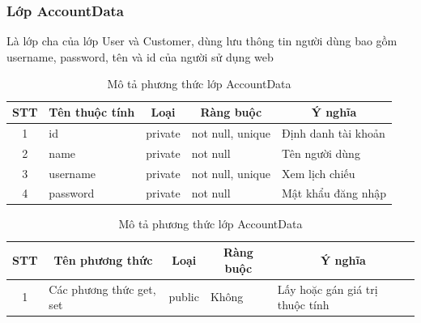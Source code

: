 \documentclass[a4paper, 12pt]{article}
\begin{document}
\subsubsection{Lớp AccountData}
Là lớp cha của lớp User và Customer, dùng lưu thông tin người dùng bao gồm username, password, tên và id của người sử dụng web
\begin{table}[h]
	\begin{center}
		\begin{tabular}{|c|l|c|l|l|}
			\hline
			STT & \multicolumn{1}{c|}{Tên thuộc tính} & Loại                         & \multicolumn{1}{c|}{Ràng buộc} & \multicolumn{1}{c|}{Ý nghĩa} \\ \hline
			1   & id                                  & \multicolumn{1}{l|}{private} & not null, unique               & Định danh tài khoản          \\ \hline
			2   & name                                & private                      & not null                       & Tên người dùng               \\ \hline
			3   & username                            & private                      & not null, unique               & Xem lịch chiếu               \\ \hline
			4   & password                            & private                      & not null                       & Mật khẩu đăng nhập           \\ \hline
			\end{tabular}
		\caption{Mô tả phương thức lớp AccountData}
	\end{center}
\end{table}

\begin{table}[H]
	\begin{center}
		\begin{tabular}{|c|l|c|l|l|}
			\hline
			STT & \multicolumn{1}{c|}{Tên phương thức} & Loại   & \multicolumn{1}{c|}{Ràng buộc} & \multicolumn{1}{c|}{Ý nghĩa}    \\ \hline
			1   & Các phương thức get, set             & public &             Không                   & Lấy hoặc gán giá trị thuộc tính \\ \hline
			\end{tabular}
		\caption{Mô tả phương thức lớp AccountData}
	\end{center}
\end{table}
\end{document}
